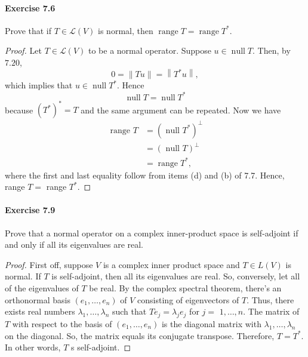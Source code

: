 \documentclass{article}
\theoremstyle{definition}
\begin{document}
\paragraph{Exercise 7.6} Prove that if $T \in \mathcal{L}(V)$ is normal, then $\operatorname{range} T=\operatorname{range} T^{*}.$
\begin{proof}
    Let $T \in \mathcal{L}(V)$ to be a normal operator.
Suppose $u \in \operatorname{null} T$. Then, by $7.20$,
$$
0=\|T u\|=\left\|T^* u\right\|,
$$
which implies that $u \in \operatorname{null} T^*$.
Hence
$$
\operatorname{null} T=\operatorname{null} T^*
$$
because $\left(T^*\right)^*=T$ and the same argument can be repeated.
Now we have
$$
\begin{aligned}
\text { range } T & =\left(\text { null } T^*\right)^{\perp} \\
& =(\text { null } T)^{\perp} \\
& =\operatorname{range} T^*,
\end{aligned}
$$
where the first and last equality follow from items (d) and (b) of 7.7.
Hence, range $T=$ range $T^*$.
\end{proof}



\paragraph{Exercise 7.9} Prove that a normal operator on a complex inner-product space is self-adjoint if and only if all its eigenvalues are real.
\begin{proof}
    First off, suppose $V$ is a complex inner product space and $T \in L(V)$ is normal. If $T$ is self-adjoint, then all its eigenvalues are real. So, conversely, let all of the eigenvalues of $T$ be real. By the complex spectral theorem, there's an orthonormal basis $\left(e_1, \ldots, e_n\right)$ of $V$ consisting of eigenvectors of $T$. Thus, there exists real numbers $\lambda_1, \ldots, \lambda_n$ such that $T e_j=\lambda_j e_j$ for $j=$ $1, \ldots, n$.
The matrix of $T$ with respect to the basis of $\left(e_1, \ldots, e_n\right)$ is the diagonal matrix with $\lambda_1, \ldots, \lambda_n$ on the diagonal. So, the matrix equals its conjugate transpose. Therefore, $T=T^*$. In other words, $T$ s self-adjoint.
\end{proof}
\end{document}
